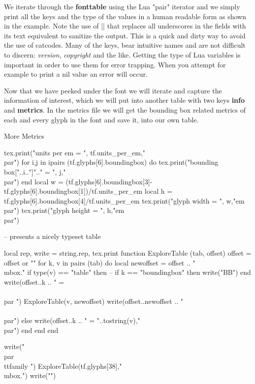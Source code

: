 We iterate through the \textbf{fonttable} using the Lua  "pair" iterator and we simply print all the keys and the type of the values in a human readable form as shown in the example. Note the use of |\textunderscore| that replaces all underscores in the fields with its text equivalent to sanitize the output. This is a quick and dirty way to avoid the use of catcodes. Many of the keys, bear intuitive names and are not difficult to discern: \textit{version}, \textit{copyright} and the like. Getting the type of Lua variables is important in order to use them for error trapping. When you attempt for example to print a nil value an error will occur.

Now that we have peeked under the font we will iterate and capture the information of interest, which we will put into another table with two keys \textbf{info}  and \textbf{metrics}. In the metrics file we will get the bounding box related metrics of each and every glyph in the font and save it, into our own table. 

\begin{texexample}{More Metrics}{}
  \begin{luacode*}
   tex.print("units per em = ", tf.units_per_em,"\\par")
   for i,j in ipairs (tf.glyphs[6].boundingbox) do
      tex.print("bounding box["..i.."]".." = ", j,"\\par")
   end 
   local w = (tf.glyphs[6].boundingbox[3]-tf.glyphs[6].boundingbox[1])/tf.units_per_em
   local h = tf.glyphs[6].boundingbox[4]/tf.units_per_em
   tex.print("glyph width = ", w,"em\\par")
   tex.print("glyph height = ", h,"em\\par")

-- presents a nicely typeset table 

local rep, write = string.rep, tex.print
function ExploreTable (tab, offset)
    offset = offset or ""
    for k, v in pairs (tab) do
        local newoffset = offset .. "\\mbox{.}"
        if type(v) == "table" then
           -- if k == "boundingbox" then write("BB") end
           write(offset..k .. " = \\{\\par ")
           ExploreTable(v, newoffset)
           write(offset..newoffset .. "\\}\\par")
         else
           write(offset..k .. " = "..tostring(v),"\\par")
         end
      end
end

write("\\par{\\ttfamily ")
ExploreTable(tf.glyphs[38],"\\mbox{.}")
write("}")
  \end{luacode*}
\end{texexample}

